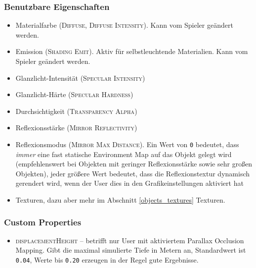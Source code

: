 \documentclass[a4paper]{article}
\newcommand{\ccaption}[1]{\textsc{#1}}
\newcommand{\cvalue}[1]{\texttt{#1}}
\newcommand{\rarrow}{\textrightarrow}
\begin{document}
\subsubsection{Benutzbare Eigenschaften}
\begin{itemize}
\item Materialfarbe (\ccaption{Diffuse}, \ccaption{Diffuse \rarrow Intensity}). Kann vom Spieler geändert werden.
\item Emission (\ccaption{Shading \rarrow Emit}). Aktiv für selbstleuchtende Materialien. Kann vom Spieler geändert werden.
\item Glanzlicht-Intensität (\ccaption{Specular \rarrow Intensity})
\item Glanzlicht-Härte (\ccaption{Specular \rarrow Hardness})
\item Durchsichtigkeit (\ccaption{Transparency \rarrow Alpha})
\item Reflexionsstärke (\ccaption{Mirror \rarrow Reflectivity})
\item Reflexionsmodus (\ccaption{Mirror \rarrow Max Distance}). Ein Wert von \cvalue{0} bedeutet, dass \emph{immer} eine fast statische Environment Map
  auf das Objekt gelegt wird (empfehlenswert bei Objekten mit geringer Reflexionsstärke sowie sehr großen Objekten), jeder größere Wert bedeutet, dass
  die Reflexionstextur dynamisch gerendert wird, wenn der User dies in den Grafikeinstellungen aktiviert hat
\item Texturen, dazu aber mehr im Abschnitt \ref{objects_textures} Texturen.
\end{itemize}

\subsubsection{Custom Properties}
\begin{itemize}
\item \ccaption{displacementHeight} -- betrifft nur User mit aktiviertem Parallax Occlusion Mapping. Gibt die maximal simulierte Tiefe in Metern an,
      Standardwert ist \cvalue{0.04}, Werte bis \cvalue{0.20} erzeugen in der Regel gute Ergebnisse.
\end{itemize}
\end{document}
